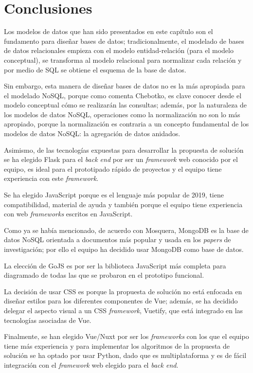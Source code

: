 \newpage\section{Conclusiones}\label{ref:conclusiones-cap3}


Los modelos de datos que han sido presentados en este capítulo son el fundamento para diseñar bases de datos; tradicionalmente, el modelado de bases de datos relacionales empieza con el modelo entidad-relación (para el modelo conceptual), se transforma al modelo relacional para normalizar cada relación y por medio de SQL se obtiene el esquema de la base de datos. 


Sin embargo, esta manera de diseñar bases de datos no es la más apropiada para el modelado NoSQL, porque como comenta Chebotko\cite{chebotko_big_2015}, es clave conocer desde el modelo conceptual cómo se realizarán las consultas; además, por la naturaleza de los modelos de datos NoSQL, operaciones como la normalización no son lo más apropiado, porque la normalización es contraria a un concepto fundamental de los modelos de datos NoSQL: la agregación de datos anidados.

Asimismo, de las tecnologías expuestas para desarrollar la propuesta de solución se ha elegido Flask para el \textit{back end} por ser un \textit{framework} web conocido por el equipo, es ideal para el prototipado rápido de proyectos y el equipo tiene experiencia con este \textit{framework}.


Se ha elegido JavaScript porque es el lenguaje más popular de 2019, tiene compatibilidad, material de ayuda y también porque el equipo tiene experiencia con web \textit{frameworks} escritos en JavaScript.


Como ya se había mencionado, de acuerdo con Mosquera\cite{martinez-mosquera_modeling_2020}, MongoDB es la base de datos NoSQL orientada a documentos más popular y usada en los \textit{papers} de investigación; por ello el equipo ha decidido usar MongoDB como base de datos.


La elección de GoJS es por ser la biblioteca JavaScript más completa para diagramado de todas las que se probaron en el prototipo funcional.



La decisión de usar CSS es porque la propuesta de solución no está enfocada en diseñar estilos para los diferentes componentes de Vue; además, se ha decidido delegar el aspecto visual a un CSS \textit{framework}, Vuetify, que está integrado en las tecnologías asociadas de Vue.


Finalmente, se han elegido Vue/Nuxt por ser los \textit{frameworks} con los que el equipo tiene más experiencia y para implementar los algoritmos de la propuesta de solución se ha optado por usar Python, dado que es multiplataforma y es de fácil integración con el \textit{framework} web elegido para el \textit{back end}.
